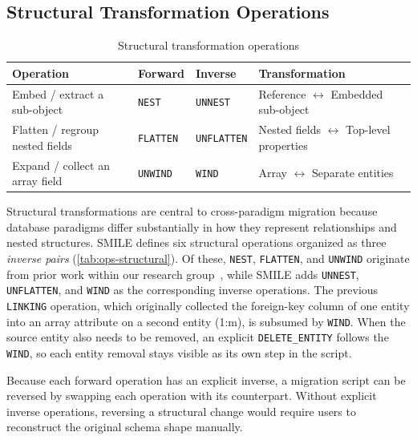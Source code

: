 \subsection{Structural Transformation Operations}\label{subsec:op-structural}
  \begin{table}[h]
  \centering
  \small
  \begin{tabular}{>{\raggedright\arraybackslash}p{3.2cm}llp{4.5cm}}
  \toprule
  \textbf{Operation} & \textbf{Forward} & \textbf{Inverse} & \textbf{Transformation} \\
  \midrule
  Embed / extract a sub-object    & \texttt{NEST}    & \texttt{UNNEST}    & Reference $\leftrightarrow$ Embedded sub-object       \\
  Flatten / regroup nested fields & \texttt{FLATTEN} & \texttt{UNFLATTEN} & Nested fields $\leftrightarrow$ Top-level properties  \\
  Expand / collect an array field & \texttt{UNWIND}  & \texttt{WIND}      & Array $\leftrightarrow$ Separate entities             \\
  \bottomrule
  \end{tabular}
  \caption{Structural transformation operations}
  \label{tab:ops-structural}
  \end{table}
  Structural transformations are central to cross-paradigm migration because database paradigms differ substantially in how they represent
  relationships and nested structures. SMILE defines six structural operations organized as three \emph{inverse pairs}
  (\autoref{tab:ops-structural}). Of these, \texttt{NEST}, \texttt{FLATTEN}, and \texttt{UNWIND} originate from prior work within our research
  group~\cite{meier2023datenmigration}, while SMILE  adds \texttt{UNNEST}, \texttt{UNFLATTEN}, and \texttt{WIND} as the corresponding inverse
  operations. The previous \texttt{LINKING} operation, which originally collected the foreign-key column of one entity into an array attribute on a second entity (1:m), is subsumed by \texttt{WIND}. When the source entity also needs to be removed, an explicit \texttt{DELETE\_ENTITY} follows the \texttt{WIND}, so each entity removal stays visible as its own step in the script.

  Because each forward operation has an explicit inverse, a migration script can be reversed by swapping each operation with its counterpart. Without explicit inverse operations, reversing a structural change would require users to reconstruct the original schema shape manually.

